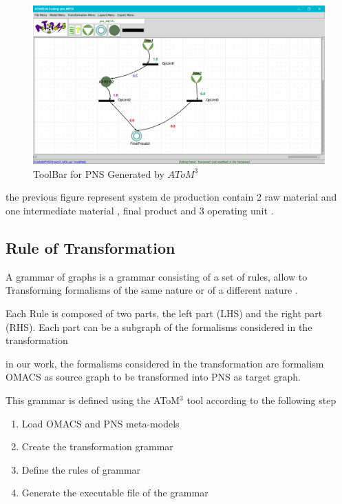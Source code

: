 \begin{figure}[th]
	\centering
 	\includegraphics[scale=0.3]{Chapiter3/img/pns_model}
	\caption{\label{fig:PNS Model}ToolBar for PNS Generated by $AToM^3$}
\end{figure} 

the previous figure represent system de production contain 2 raw material and one intermediate material , final product and 3 operating unit .





\pagebreak
\subsection{ Rule of Transformation }
A grammar of graphs is a grammar consisting of a set of rules, allow to 
Transforming formalisms of the same nature or of a different nature . 

Each Rule is composed of two parts, the left part (LHS) and the right part (RHS).
Each part can be a subgraph of the formalisms considered in the transformation

in our work, the formalisms considered in the transformation are formalism
OMACS as source graph to be transformed into PNS as target graph.

This grammar is defined using the AToM$^3$ tool according to the following step

\begin{enumerate}
	\item Load OMACS and PNS meta-models
	\item Create the transformation grammar
	\item Define the rules of grammar
	\item Generate the executable file of the grammar
\end{enumerate}
 
